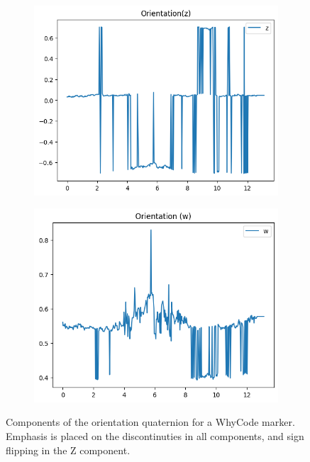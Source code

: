 \begin{figure}
\begin{subfigure}[b]{0.49\textwidth}
         \includegraphics[width=\textwidth]{images/orientation_z_figure.png}
    \end{subfigure}
    \hfill
    \begin{subfigure}[b]{0.49\textwidth}
         \centering
         \includegraphics[width=\textwidth]{images/orientation_w_figure.png}
    \end{subfigure}
    \caption{Components of the orientation quaternion for a WhyCode marker. Emphasis is placed on the discontinuties in all components, and sign flipping in the Z component.}
    \label{figure:orientation_flipping}
\end{figure}

